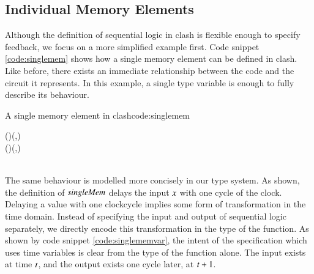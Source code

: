 \subsection{Individual Memory Elements}
Although the definition of sequential logic in \gls{clash} is flexible enough to specify feedback, we focus on a more simplified example first.
Code snippet \ref{code:singlemem} shows how a single memory element can be defined in \gls{clash}.
Like before, there exists an immediate relationship between the code and the circuit it represents.
In this example, a single type variable is enough to fully describe its behaviour.

\begin{texexptitled}{A single memory element in \gls{clash}}{code:singlemem}\begin{hscode}\SaveRestoreHook
{}%
%
%
%
%
%
\>[3]{}\mathbin{::}(\;)\to {}\to (\;,){}\<[E]%
\\
\>[3]{}\;(\;)\;\mathrel{=}(\;,){}\<[E]%
\\
\>[3]{}\<[5]%
\>[5]{}\;{}\<[13]%
\>[13]{}\<[19]%
\>[19]{}\mathrel{=}\<[E]%
\\
\>[13]{}\<[19]%
\>[19]{}\mathrel{=}\<[E]%
\ColumnHook
\end{hscode}\resethooks
\end{texexptitled}


The same behaviour is modelled more concisely in our type system.
As shown, the definition of \ensuremath{\Varid{singleMem}} delays the input \ensuremath{\Varid{x}} with one cycle of the clock.
Delaying a value with one clockcycle implies some form of transformation in the time domain.
Instead of specifying the input and output of sequential logic separately, we directly encode this transformation in the type of the function.
As shown by code snippet \ref{code:singlememvar}, the intent of the specification which uses time variables is clear from the type of the function alone.
The input exists at time \ensuremath{\Varid{t}}, and the output exists one cycle later, at \ensuremath{\Varid{t}\mathbin{+}\mathrm{1}}.

